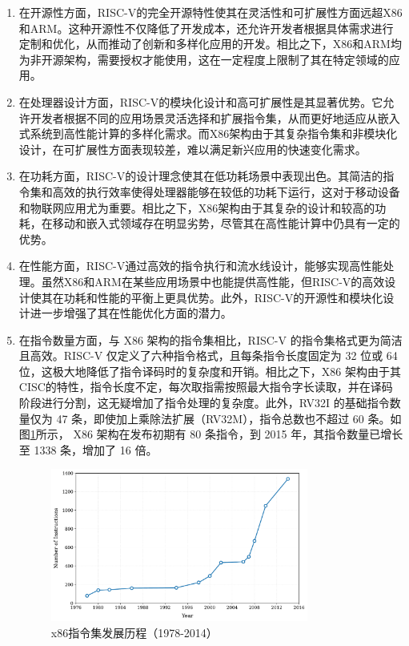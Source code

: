 \begin{enumerate}[label={\arabic*)},itemsep=0pt, parsep=0pt]
	\item 在开源性方面，RISC-V的完全开源特性使其在灵活性和可扩展性方面远超X86和ARM。这种开源性不仅降低了开发成本，还允许开发者根据具体需求进行定制和优化，从而推动了创新和多样化应用的开发。相比之下，X86和ARM均为非开源架构，需要授权才能使用，这在一定程度上限制了其在特定领域的应用。

	\item 在处理器设计方面，RISC-V的模块化设计和高可扩展性是其显著优势。它允许开发者根据不同的应用场景灵活选择和扩展指令集，从而更好地适应从嵌入式系统到高性能计算的多样化需求。而X86架构由于其复杂指令集和非模块化设计，在可扩展性方面表现较差，难以满足新兴应用的快速变化需求。

	\item 在功耗方面，RISC-V的设计理念使其在低功耗场景中表现出色。其简洁的指令集和高效的执行效率使得处理器能够在较低的功耗下运行，这对于移动设备和物联网应用尤为重要。相比之下，X86架构由于其复杂的设计和较高的功耗，在移动和嵌入式领域存在明显劣势，尽管其在高性能计算中仍具有一定的优势。

	\item 在性能方面，RISC-V通过高效的指令执行和流水线设计，能够实现高性能处理。虽然X86和ARM在某些应用场景中也能提供高性能，但RISC-V的高效设计使其在功耗和性能的平衡上更具优势。此外，RISC-V的开源性和模块化设计进一步增强了其在性能优化方面的潜力。

	\item 在指令数量方面，与 X86 架构的指令集相比，RISC-V 的指令集格式更为简洁且高效。RISC-V 仅定义了六种指令格式，且每条指令长度固定为 32 位或 64 位，这极大地降低了指令译码时的复杂度和开销。相比之下，X86 架构由于其CISC的特性，指令长度不定，每次取指需按照最大指令字长读取，并在译码阶段进行分割，这无疑增加了指令处理的复杂度。此外，RV32I 的基础指令数量仅为 47 条，即使加上乘除法扩展（RV32M），指令总数也不超过 60 条。如图\ref{fig:x86_growth}所示， X86 架构在发布初期有 80 条指令，到 2015 年，其指令数量已增长至 1338 条，增加了 16 倍。

	      \begin{figure}[htbp]
		      \centering
		      \includegraphics[width=0.8\textwidth]{image/x86_growth.pdf}
		      \caption{x86指令集发展历程（1978-2014）}
		      \label{fig:x86_growth}
	      \end{figure}

\end{enumerate}

